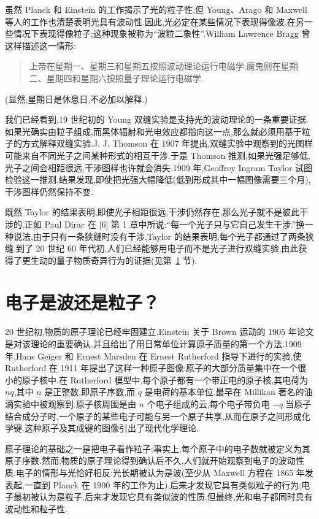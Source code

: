 虽然 Planck 和 Einstein 的工作揭示了光的粒子性,但 Young、Arago 和 Maxwell 等人的工作也清楚表明光具有波动性.因此,光必定在某些情况下表现得像波,在另一些情况下表现得像粒子;这种现象被称为“波粒二象性”.William Lawrence Bragg 曾这样描述这一情形:

\begin{quote}
上帝在星期一、星期三和星期五按照波动理论运行电磁学;魔鬼则在星期二、星期四和星期六按照量子理论运行电磁学.
\end{quote}

(显然,星期日是休息日,不必加以解释.)

我们已经看到,19 世纪初的 Young 双缝实验是支持光的波动理论的一条重要证据.如果光确实由粒子组成,而黑体辐射和光电效应都指向这一点,那么就必须用基于粒子的方式解释双缝实验.J. J. Thomson 在 1907 年提出,双缝实验中观察到的光图样可能来自不同光子之间某种形式的相互干涉.于是 Thomson 推测,如果光强足够低,光子之间会相距很远,干涉图样也许就会消失.1909 年,Geoffrey Ingram Taylor 试图检验这一推测,结果发现,即使把光强大幅降低(低到形成其中一幅图像需要三个月),干涉图样仍然保持不变.

既然 Taylor 的结果表明,即使光子相距很远,干涉仍然存在,那么光子就不是彼此干涉的.正如 Paul Dirac 在 [6] 第 1 章中所说:“每一个光子只与它自己发生干涉.”换一种说法,由于只有一条狭缝时没有干涉,Taylor 的结果表明,每个光子都通过了两条狭缝.到了 20 世纪 60 年代初,人们已经能够用电子而不是光子进行双缝实验,由此获得了更生动的量子物质奇异行为的证据(见第~\ref{sec:electron-wave-particle} 节).

\section{电子是波还是粒子？}\label{sec:electron-wave-particle}

20 世纪初,物质的原子理论已经牢固建立.Einstein 关于 Brown 运动的 1905 年论文是对该理论的重要确认,并且给出了用日常单位计算原子质量的第一个方法.1909 年,Hans Geiger 和 Ernest Marsden 在 Ernest Rutherford 指导下进行的实验,使 Rutherford 在 1911 年提出了这样一种原子图像:原子的大部分质量集中在一个很小的原子核中.在 Rutherford 模型中,每个原子都有一个带正电的原子核,其电荷为 $nq$,其中 $n$ 是正整数,即原子序数,而 $q$ 是电荷的基本单位,最早在 Millikan 著名的油滴实验中被观察到.原子核周围是由 $n$ 个电子组成的云,每个电子带负电 $-q$.当原子结合成分子时,一个原子的某些电子可能与另一个原子共享,从而在原子之间形成化学键.这种原子及其成键的图像引出了现代化学理论.

原子理论的基础之一是把电子看作粒子;事实上,每个原子中的电子数就被定义为其原子序数.然而,物质的原子理论得到确认后不久,人们就开始观察到电子的波动性质.电子的情形与光恰好相反:光长期被认为是波(至少从 Maxwell 方程在 1865 年发表起,一直到 Planck 在 1900 年的工作为止),后来才发现它具有类似粒子的行为;电子最初被认为是粒子,后来才发现它具有类似波的性质.但最终,光和电子都同时具有波动性和粒子性.

